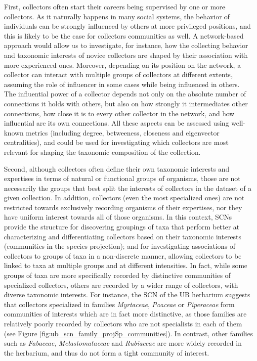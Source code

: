 First, collectors often start their careers being supervised by one or more collectors.
As it naturally happens in many social systems, the behavior of individuals can be strongly influenced by others at more privileged positions, and this is likely to be the case for collectors communities as well.
A network-based approach would allow us to investigate, for instance, how the collecting behavior and taxonomic interests of novice collectors are shaped by their association with more experienced ones.
Moreover, depending on its position on the network, a collector can interact with multiple groups of collectors at different extents, assuming the role of influencer in some cases while being influenced in others.
The influential power of a collector depends not only on the absolute number of connections it holds with others, but also on how strongly it intermediates other connections, how close it is to every other collector in the network, and how influential are its own connections. %
All these aspects can be assessed using well-known metrics (including degree, betweeness, closeness and eigenvector centralities), and could be used for investigating which collectors are most relevant for shaping the taxonomic composition of the collection. 

Second, although collectors often define their own taxonomic interests and expertises in terms of natural or functional groups of organisms, those are not necessarily the groups that best split the interests of collectors in the dataset of a given collection.
In addition, collectors (even the most specialized ones) are not restricted towards exclusively recording organisms of their expertises, nor they have uniform interest towards all of those organisms.
%
In this context, SCNs provide the structure for discovering groupings of taxa that perform better at characterizing and differentiating collectors based on their taxonomic interests (communities in the species projection); and for investigating associations of collectors to groups of taxa in a non-discrete manner, allowing collectors to be linked to taxa at multiple groups and at different intensities.
%
In fact, while some groups of taxa are more specifically recorded by distinctive communities of specialized collectors, others are recorded by a wider range of collectors, with diverse taxonomic interests.
For instance, the SCN of the UB herbarium suggests that collectors specialized in families \textit{Myrtaceae}, \textit{Poaceae} or \textit{Piperaceae} form communities of interests which are in fact more distinctive, as those families are relatively poorly recorded by collectors who are not specialists in each of them (see Figure \ref{fig:ub_scn_family_projSp_communities}).
In contrast, other families such as \textit{Fabaceae}, \textit{Melastomataceae} and \textit{Rubiaceae} are more widely recorded in the herbarium, and thus do not form a tight community of interest.


